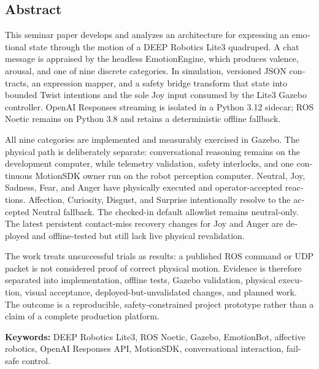 \begin{english}
\chapter*{Abstract}

This seminar paper develops and analyzes an architecture for expressing an
emotional state through the motion of a DEEP Robotics Lite3 quadruped. A chat
message is appraised by the headless EmotionEngine, which produces valence,
arousal, and one of nine discrete categories. In simulation, versioned JSON
contracts, an expression mapper, and a safety bridge transform that state into
bounded Twist intentions and the sole Joy input consumed by the Lite3 Gazebo
controller. OpenAI Responses streaming is isolated in a Python 3.12 sidecar;
ROS Noetic remains on Python 3.8 and retains a deterministic offline fallback.

All nine categories are implemented and measurably exercised in Gazebo. The
physical path is deliberately separate: conversational reasoning remains on the
development computer, while telemetry validation, safety interlocks, and one
continuous MotionSDK owner run on the robot perception computer. Neutral, Joy,
Sadness, Fear, and Anger have physically executed and operator-accepted
reactions. Affection, Curiosity, Disgust, and Surprise intentionally resolve to
the accepted Neutral fallback. The checked-in default allowlist remains
neutral-only. The latest persistent contact-miss recovery changes for Joy and
Anger are deployed and offline-tested but still lack live physical
revalidation.

The work treats unsuccessful trials as results: a published ROS command or UDP
packet is not considered proof of correct physical motion. Evidence is
therefore separated into implementation, offline tests, Gazebo validation,
physical execution, visual acceptance, deployed-but-unvalidated changes, and
planned work. The outcome is a reproducible, safety-constrained project
prototype rather than a claim of a complete production platform.

\noindent\textbf{Keywords:} DEEP Robotics Lite3, ROS Noetic, Gazebo,
EmotionBot, affective robotics, OpenAI Responses API, MotionSDK, conversational
interaction, fail-safe control.
\end{english}
